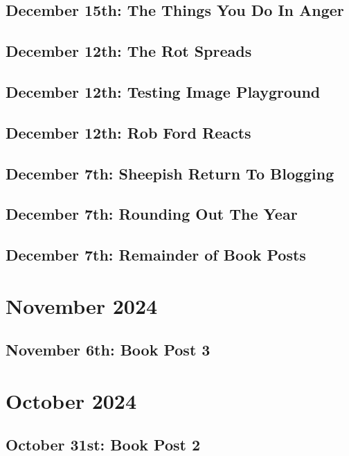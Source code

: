 \documentclass[12pt,letterpaper]{report}
\begin{document}
\subsection{December 15th: The Things You Do In Anger}

\subsection{December 12th: The Rot Spreads}

\subsection{December 12th: Testing Image Playground}

\subsection{December 12th: Rob Ford Reacts}

\subsection{December 7th: Sheepish Return To Blogging}

\subsection{December 7th: Rounding Out The Year}

\subsection{December 7th: Remainder of Book Posts}

\section{November 2024}
\subsection{November 6th: Book Post 3}

\section{October 2024}
\subsection{October 31st: Book Post 2}

\end{document}
